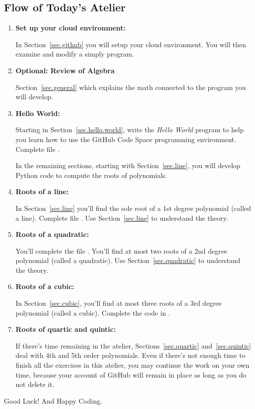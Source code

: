 \subsection{Flow of Today's Atelier}
\begin{enumerate}
\item \textbf{ Set up your cloud environment:}

  In Section~\ref{sec.github} you will setup your cloud environment. You
  will then examine and modify a simply  program.

\item \textbf{Optional: Review of Algebra}

  Section~\ref{sec.general} which explains the math
  connected to the program you will develop.

\item \textbf{Hello World:}

  Starting in Section~\ref{sec.hello.world}, write the
  \emph{Hello World} program to help you learn how to use the GitHub
  Code Space programming environment.  Complete file .

In the remaining sections, starting with Section~\ref{sec.line}, you
will develop Python code to compute the roots of polynomials.  

\item \textbf{Roots of a line:}

  In Section~\ref{sec.line} you'll find the sole root of a 1st
  degree polynomial (called a line).  Complete file .
  Use Section~\ref{sec.line} to understand the theory.

\item \textbf{Roots of a quadratic:}

  You'll complete the file
  .  You'll find at most two roots of a 2nd degree
  polynomial (called a quadratic).  Use Section~\ref{sec.quadratic} to
  understand the theory.

\item \textbf{Roots of a cubic:}

  In Section~\ref{sec.cubic}, you'll find at most
  three roots of a 3rd degree polynomial (called a cubic).  Complete
  the code in .

\item \textbf{Roots of quartic and quintic:}

  If there's time remaining in the
  atelier, Sections~\ref{sec.quartic} and~\ref{sec.quintic} deal with
  4th and 5th order polynomials.  Even if there's not enough time to
  finish all the exercises in this atelier, you may continue the work
  on your own time, because your account of GitHub will remain in
  place as long as you do not delete it.
  
\end{enumerate}


Good Luck! And Happy Coding.


